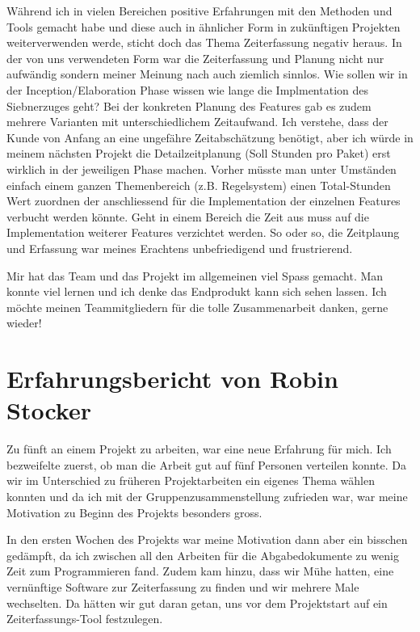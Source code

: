 \documentclass[12pt,halfparskip]{scrartcl}
\begin{document}
Während ich in vielen Bereichen positive Erfahrungen mit den Methoden und Tools gemacht habe und diese auch in ähnlicher Form in zukünftigen Projekten weiterverwenden werde, sticht doch das Thema Zeiterfassung negativ heraus. In der von uns verwendeten Form war die Zeiterfassung und Planung nicht nur aufwändig sondern meiner Meinung nach auch ziemlich sinnlos. Wie sollen wir in der Inception/Elaboration Phase wissen wie lange die Implmentation des Siebnerzuges geht? Bei der konkreten Planung des Features gab es zudem mehrere Varianten mit unterschiedlichem Zeitaufwand. Ich verstehe, dass der Kunde von Anfang an eine ungefähre Zeitabschätzung benötigt, aber ich würde in meinem nächsten Projekt die Detailzeitplanung (Soll Stunden pro Paket) erst wirklich in der jeweiligen Phase machen. Vorher müsste man unter Umständen einfach einem ganzen Themenbereich (z.B. Regelsystem) einen Total-Stunden Wert zuordnen der anschliessend für die Implementation der einzelnen Features verbucht werden könnte. Geht in einem Bereich die Zeit aus muss auf die Implementation weiterer Features verzichtet werden. So oder so, die Zeitplaung und Erfassung war meines Erachtens unbefriedigend und frustrierend.

Mir hat das Team und das Projekt im allgemeinen viel Spass gemacht. Man konnte viel lernen und ich denke das Endprodukt kann sich sehen lassen. Ich möchte meinen Teammitgliedern für die tolle Zusammenarbeit danken, gerne wieder!

\section{Erfahrungsbericht von Robin Stocker}

Zu fünft an einem Projekt zu arbeiten, war eine neue Erfahrung für mich. Ich bezweifelte zuerst, ob man die Arbeit gut auf fünf Personen verteilen konnte. Da wir im Unterschied zu früheren Projektarbeiten ein eigenes Thema wählen konnten und da ich mit der Gruppenzusammenstellung zufrieden war, war meine Motivation zu Beginn des Projekts besonders gross.

In den ersten Wochen des Projekts war meine Motivation dann aber ein bisschen gedämpft, da ich zwischen all den Arbeiten für die Abgabedokumente zu wenig Zeit zum Programmieren fand. Zudem kam hinzu, dass wir Mühe hatten, eine vernünftige Software zur Zeiterfassung zu finden und wir mehrere Male wechselten. Da hätten wir gut daran getan, uns vor dem Projektstart auf ein Zeiterfassungs-Tool festzulegen.
\end{document}
